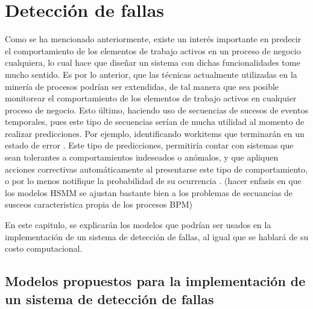 \chapter{Detección de fallas}

\ifpdf
    \graphicspath{{Chapter3/Figs/Raster/}{Chapter3/Figs/PDF/}{Chapter3/Figs/}}
\else
    \graphicspath{{Chapter3/Figs/Vector/}{Chapter3/Figs/}}
\fi

Como se ha mencionado anteriormente, existe un interés importante en predecir el comportamiento de los elementos de trabajo activos en un proceso de negocio cualquiera, lo cual hace que diseñar un sistema con dichas funcionalidades tome mucho sentido. Es por lo anterior, que las técnicas actualmente utilizadas en la minería de procesos podrían ser extendidas, de tal manera que sea posible monitorear el comportamiento de los elementos de trabajo activos en cualquier proceso de negocio. Esto último, haciendo uso de secuencias de sucesos de eventos temporales, pues este tipo de secuencias serían de mucha utilidad al momento de realizar predicciones. Por ejemplo, identificando workitems que terminarán en un estado de error \cite{Kang2014}. Este tipo de predicciones, permitiría contar con sistemas que sean tolerantes a comportamientos indeseados o anómalos, y que apliquen acciones correctivas automáticamente al presentarse este tipo de comportamiento, o por lo menos notifique la probabilidad de su ocurrencia \cite{Yu2006,Salfner2007}. 
(hacer enfasis en que los modelos HSMM se ajustan bastante bien a los problemas de secuancias de susceos caracteristica propia de los procesos BPM)

En este capitulo, se explicarán los modelos que podrían ser usados en la implementación de un sistema de detección de fallas, al igual que se hablará de su costo computacional.

\section{Modelos propuestos para la implementación de un sistema de detección de fallas} %
\label{section3.1}

